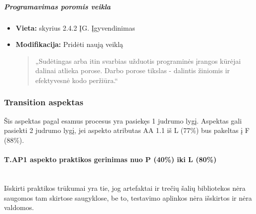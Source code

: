 \documentclass{article}
\newcommand{\subsubsubsection}[1]{\paragraph{#1}\mbox{}\\}
\begin{document}
\subparagraph{Programavimas poromis veikla}
\begin{itemize}
    \item \textbf{Vieta:} skyrius 2.4.2 ĮG. Įgyvendinimas
    \item \textbf{Modifikacija:} Pridėti naują veiklą
    \begin{quote} „Sudėtingas arba itin svarbias užduotis programinės įrangos kūrėjai dalinai atlieka porose. Darbo porose tikslas - dalintis žiniomis ir efektyvesnė kodo peržiūra.“
    \end{quote}
\end{itemize}

\newpage
\subsubsection{Transition aspektas}

Šis aspektas pagal esamus procesus yra pasiekęs 1 judrumo lygį. Aspektas gali pasiekti 2 judrumo lygį, jei aspekto 
atributas AA 1.1 iš L (77\%) bus pakeltas į F (88\%).


\subsubsubsection{T.AP1 aspekto praktikos gerinimas nuo P (40\%) iki L (80\%)}

Išskirti praktikos trūkumai yra tie, jog artefaktai ir trečių šalių bibliotekos nėra saugomos tam skirtose saugyklose, be to, testavimo aplinkos nėra išskirtos ir nėra valdomos.
\end{document}
